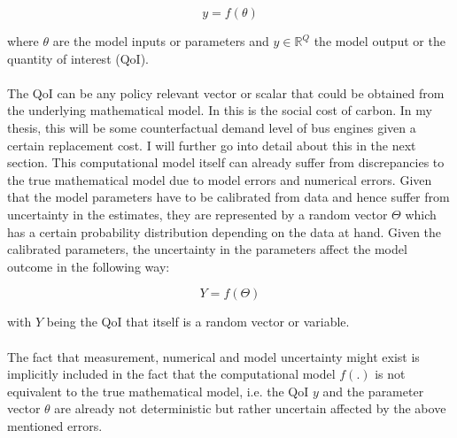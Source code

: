 \begin{equation}
	y = f(\theta)
	\label{compmodel}
\end{equation}

where $\theta$ are the model inputs or parameters and $y \in \mathbb{R}^Q$ the model output or the quantity of interest (QoI). \paragraph{}
The QoI can be any policy relevant vector or scalar that could be obtained from the underlying mathematical model. In \cite{Cai.2019} this is the social cost of carbon. In my thesis, this will be some counterfactual demand level of bus engines given a certain replacement cost. I will further go into detail about this in the next section. This computational model itself can already suffer from discrepancies to the true mathematical model due to model errors and numerical errors. Given that the model parameters have to be calibrated from data and hence suffer from uncertainty in the estimates, they are represented by a random vector $\Theta$ which has a certain probability distribution depending on the data at hand. Given the calibrated parameters, the uncertainty in the parameters affect the model outcome in the following way:

\begin{equation}
	Y = f(\Theta)
	\label{uncertaincompmodel}
\end{equation}

with $Y$ being the QoI that itself is a random vector or variable. \paragraph{}

The fact that measurement, numerical and model uncertainty might exist is implicitly included in the fact that the computational model $f(.)$ is not equivalent to the true mathematical model, i.e. the QoI $y$ and the parameter vector $\theta$ are already not deterministic but rather uncertain affected by the above mentioned errors.

